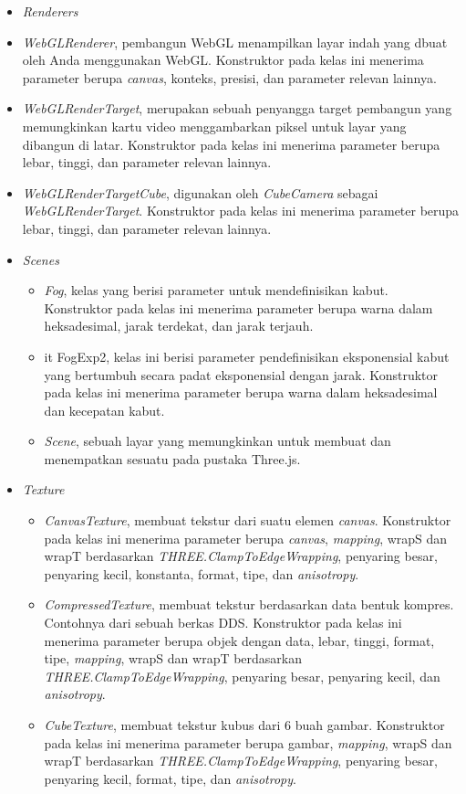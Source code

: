 \begin{itemize}
\begin{itemize}
	\end{itemize}

\item \textit{Renderers}
	\item {\it WebGLRenderer}, pembangun WebGL menampilkan layar indah yang dbuat oleh Anda menggunakan WebGL. Konstruktor pada kelas ini menerima parameter berupa {\it canvas}, konteks, presisi, dan parameter relevan lainnya.
	
	\item {\it WebGLRenderTarget}, merupakan sebuah penyangga target pembangun yang memungkinkan kartu video menggambarkan piksel untuk layar yang dibangun di latar. Konstruktor pada kelas ini menerima parameter berupa lebar, tinggi, dan parameter relevan lainnya.
	
	\item {\it WebGLRenderTargetCube}, digunakan oleh {\it CubeCamera} sebagai {\it WebGLRenderTarget}. Konstruktor pada kelas ini menerima parameter berupa lebar, tinggi, dan parameter relevan lainnya.
		
\item \textit{Scenes}

	\begin{itemize}
	\item {\it Fog}, kelas yang berisi parameter untuk mendefinisikan kabut. Konstruktor pada kelas ini menerima parameter berupa warna dalam heksadesimal, jarak terdekat, dan jarak terjauh.
	
	\item {it FogExp2}, kelas ini berisi parameter pendefinisikan eksponensial kabut yang bertumbuh secara padat eksponensial dengan jarak. Konstruktor pada kelas ini menerima parameter berupa warna dalam heksadesimal dan kecepatan kabut.
	
	\item {\it Scene}, sebuah layar yang memungkinkan untuk membuat dan menempatkan sesuatu pada pustaka Three.js. 
	\end{itemize}
	
\item \textit{Texture}
	\begin{itemize}
	\item{\it CanvasTexture}, membuat tekstur dari suatu elemen {\it canvas}. Konstruktor pada kelas ini menerima parameter berupa {\it canvas}, {\it mapping}, wrapS dan wrapT berdasarkan {\it THREE.ClampToEdgeWrapping}, penyaring besar, penyaring kecil, konstanta, format, tipe, dan {\it anisotropy}.
	\item{\it CompressedTexture}, membuat tekstur berdasarkan data bentuk kompres. Contohnya dari sebuah berkas DDS. Konstruktor pada kelas ini menerima parameter berupa objek dengan data, lebar, tinggi, format, tipe, {\it mapping}, wrapS dan wrapT berdasarkan {\it THREE.ClampToEdgeWrapping}, penyaring besar, penyaring kecil, dan {\it anisotropy}.
	\item{\it CubeTexture}, membuat tekstur kubus dari 6 buah gambar. Konstruktor pada kelas ini menerima parameter berupa gambar, {\it mapping},  wrapS dan wrapT berdasarkan {\it THREE.ClampToEdgeWrapping}, penyaring besar, penyaring kecil, format, tipe, dan {\it anisotropy}.
	

\end{itemize}
\end{itemize}

